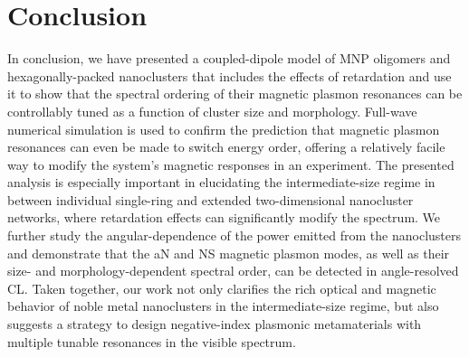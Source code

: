 \documentclass[journal=apchd5,manuscript=article]{achemso}
\begin{document}
\section*{Conclusion}
In conclusion, we have presented a coupled-dipole model of MNP oligomers and hexagonally-packed nanoclusters that includes the effects of retardation and use it to show that the spectral ordering of their magnetic plasmon resonances can be controllably tuned as a function of cluster size and morphology. Full-wave numerical simulation is used to confirm the prediction that magnetic plasmon resonances can even be made to switch energy order, offering a relatively facile way to modify the system's magnetic responses in an experiment. The presented analysis is especially important in elucidating the intermediate-size regime in between individual single-ring and extended two-dimensional nanocluster networks, where retardation effects can significantly modify the spectrum. We further study the angular-dependence of the power emitted from the nanoclusters and demonstrate that the aN and NS magnetic plasmon modes, as well as their size- and morphology-dependent spectral order, can be detected in angle-resolved CL. Taken together, our work not only clarifies the rich optical and magnetic behavior of noble metal nanoclusters in the intermediate-size regime, but also suggests a strategy to design negative-index plasmonic metamaterials with multiple tunable resonances in the visible spectrum.
\end{document}
